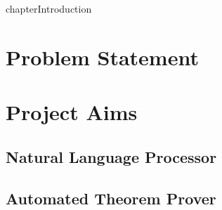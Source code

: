 chapter{Introduction}
\section{Problem Statement}
\section{Project Aims}
\subsection{Natural Language Processor}
\subsection{Automated Theorem Prover}